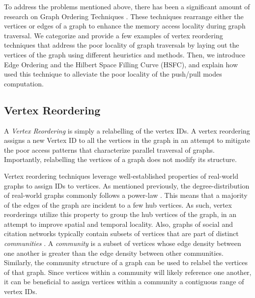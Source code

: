 To address the problems mentioned above, there has been a significant amount of research on Graph Ordering Techniques \cite{lwr, dbg, basc, iHTL, sapco, slashburn, cost}. These techniques rearrange either the vertices or edges of a graph to enhance the memory access locality during graph traversal. 
We categorize 
and provide a few examples 
of vertex reordering techniques that address the poor locality of graph traversals by laying out the vertices of the graph using different heuristics and methods. Then, we introduce Edge Ordering and the Hilbert Space Filling Curve (\ac{HSFC}), and explain how \citet{cost} used this technique to alleviate the poor locality of the push/pull modes computation. 

\subsection{Vertex Reordering}
A \textit{Vertex Reordering} is simply a relabelling of the vertex IDs. A vertex reordering assigns a new Vertex ID to all the vertices in the graph in an attempt to mitigate the poor access patterns that characterize parallel traversal of graphs. Importantly, relabelling the vertices of a graph does not modify its structure. 

Vertex reordering techniques leverage well-established properties of real-world graphs to assign IDs to vertices.
As mentioned previously, the degree-distribution of real-world graphs commonly follows a power-law \cite{barabasi2009scale}. This means that a majority of the edges of the graph are incident to a few hub vertices. As such, vertex reorderings utilize this property to group the hub vertices of the graph, in an attempt to improve spatial and temporal locality. Also, graphs of social and citation networks typically contain subsets of vertices that are part of distinct \textit{communities}  \cite{girvan2002community}. A \textit{community} is a subset of vertices whose edge density between one another is greater than the edge density between other communities. Similarly, the community structure of a graph can be used to relabel the vertices of that graph. Since vertices within a community will likely reference one another, it can be beneficial to assign vertices within a community a contiguous range of vertex IDs.

